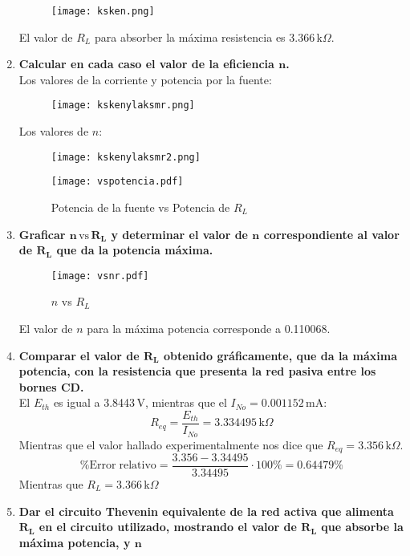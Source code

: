 \documentclass[a4paper,11pt]{report}
\begin{document}
\begin{enumerate}[label=\arabic*),font=\bfseries, style=nextline]
\begin{figure}[H]
\centering
\texttt{[image: ksken.png]}
\end{figure}
El valor de $R_{L}$ para absorber la máxima resistencia es 3.366\,k$\Omega$.
\item \textbf{Calcular en cada caso el valor de la eficiencia $\bm{n}$.}\\
Los valores de la corriente y potencia por la fuente:
\begin{figure}[H]
\texttt{[image: kskenylaksmr.png]}
\end{figure}
Los valores de $n$:
\begin{figure}[H]
\texttt{[image: kskenylaksmr2.png]}
\end{figure}
\begin{figure}[H]
\centering
\texttt{[image: vspotencia.pdf]}
\caption{Potencia de la fuente vs Potencia de $R_{L}$}
\end{figure}
\item \textbf{Graficar $\bm{n \, \mathrm{vs} \, R_{L}}$ y determinar el valor de $\bm{n}$ correspondiente al valor de $\bm{R_{L}}$ que da la potencia máxima.}
\begin{figure}[H]
\centering
\texttt{[image: vsnr.pdf]}
\caption{$n$ vs $R_{L}$}
\end{figure}
El valor de $n$ para la máxima potencia corresponde a 0.110068.
\item \textbf{Comparar el valor de $\bm{R_{L}}$ obtenido gráficamente, que da la máxima potencia, con la resistencia que presenta la red pasiva entre los bornes CD.}\\
El $E_{th}$ es igual a 3.8443\,V, mientras que el $I_{No} = 0.001152$\,mA:
$$
R_{eq} = \frac{E_{th}}{I_{No}} = 3.334495\,\mathrm{k}\Omega
$$
Mientras que el valor hallado experimentalmente nos dice que $R_{eq} = 3.356\,\mathrm{k}\Omega$.
$$
\%\mathrm{Error\;relativo} = \frac{3.356-3.34495}{3.34495}\cdot 100\% = 0.64479\% 
$$
Mientras que $R_{L} = 3.366\,\mathrm{k}\Omega$
\item \textbf{Dar el circuito Thevenin equivalente de la red activa que alimenta $\bm{R_{L}}$ en el circuito utilizado, mostrando el valor de $\bm{R_{L}}$ que absorbe la máxima potencia, y $\bm{n}$}
\begin{figure}[H]
\centering
{}
\end{figure}
\end{enumerate}
\end{document}
